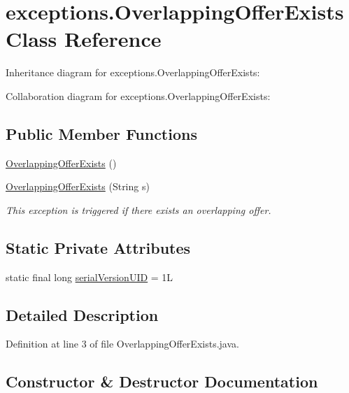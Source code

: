 \hypertarget{classexceptions_1_1OverlappingOfferExists}{}\section{exceptions.\+Overlapping\+Offer\+Exists Class Reference}
\label{classexceptions_1_1OverlappingOfferExists}


Inheritance diagram for exceptions.\+Overlapping\+Offer\+Exists\+:


Collaboration diagram for exceptions.\+Overlapping\+Offer\+Exists\+:
\subsection*{Public Member Functions}
\begin{DoxyCompactItemize}
\item 
\mbox{\hyperlink{classexceptions_1_1OverlappingOfferExists_a1ba2d73acc9428e642786973e8b2b6b3}{Overlapping\+Offer\+Exists}} ()
\item 
\mbox{\hyperlink{classexceptions_1_1OverlappingOfferExists_a053baab9b6c9e1da073098c4cfbcdc45}{Overlapping\+Offer\+Exists}} (String s)
\begin{DoxyCompactList}\small\item\em This exception is triggered if there exists an overlapping offer. \end{DoxyCompactList}\end{DoxyCompactItemize}
\subsection*{Static Private Attributes}
\begin{DoxyCompactItemize}
\item 
static final long \mbox{\hyperlink{classexceptions_1_1OverlappingOfferExists_ab47bd08f41ac7a43204806e53aa1538a}{serial\+Version\+U\+ID}} = 1L
\end{DoxyCompactItemize}


\subsection{Detailed Description}


Definition at line 3 of file Overlapping\+Offer\+Exists.\+java.



\subsection{Constructor \& Destructor Documentation}
\mbox{\label{classexceptions_1_1OverlappingOfferExists_a1ba2d73acc9428e642786973e8b2b6b3}} 
